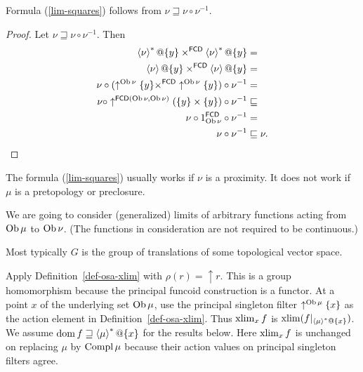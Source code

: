 \begin{prop}
Formula (\ref{lim-squares}) follows from $\nu\sqsupseteq\nu\circ\nu^{-1}$.\end{prop}
\begin{proof}
Let $\nu\sqsupseteq\nu\circ\nu^{-1}$. Then
\begin{align*}
\rsupfun{\nu}@\{y\}\times^{\mathsf{FCD}}\rsupfun{\nu}@\{y\} & =\\
\supfun{\nu}@\{y\}\times^{\mathsf{FCD}}\supfun{\nu}@\{y\} & =\\
\nu\circ(\uparrow^{\Ob\nu}\{y\}\times^{\mathsf{FCD}}\uparrow^{\Ob\nu}\{y\})\circ\nu^{-1} & =\\
\nu\circ\uparrow^{\mathsf{FCD}(\Ob\nu,\Ob\nu)}(\{y\}\times\{y\})\circ\nu^{-1} & \sqsubseteq\\
\nu\circ1_{\Ob\nu}^{\mathsf{FCD}}\circ\nu^{-1} & =\\
\nu\circ\nu^{-1} & \sqsubseteq\nu.
\end{align*}
\end{proof}
\begin{rem}
The formula (\ref{lim-squares}) usually works if $\nu$ is a proximity.
It does not work if $\mu$ is a pretopology or preclosure.
\end{rem}
We are going to consider (generalized) limits of arbitrary functions
acting from $\operatorname{Ob}\mu$ to $\operatorname{Ob}\nu$. (The functions in consideration
are not required to be continuous.)
\begin{rem}
Most typically $G$ is the group of translations of some topological
vector space.
\end{rem}
Apply Definition~\ref{def-osa-xlim} with
$\rho(r)=\uparrow r$. This is a group homomorphism because the
principal funcoid construction is a functor. At a point $x$ of the
underlying set $\operatorname{Ob}\mu$, use the principal singleton filter
$\uparrow^{\operatorname{Ob}\mu}\{x\}$ as the action element in
Definition~\ref{def-osa-xlim}. Thus $\operatorname{xlim}_x f$ is
$\operatorname{xlim}(f|_{\left\langle \mu\right\rangle ^{\ast}@\{x\}})$. We assume
$\operatorname{dom} f\sqsupseteq\left\langle \mu\right\rangle ^{\ast}@\{x\}$ for the results below.
Here $\operatorname{xlim}_x f$ is unchanged on replacing $\mu$ by $\operatorname{Compl}\mu$
because their action values on principal singleton filters agree.

